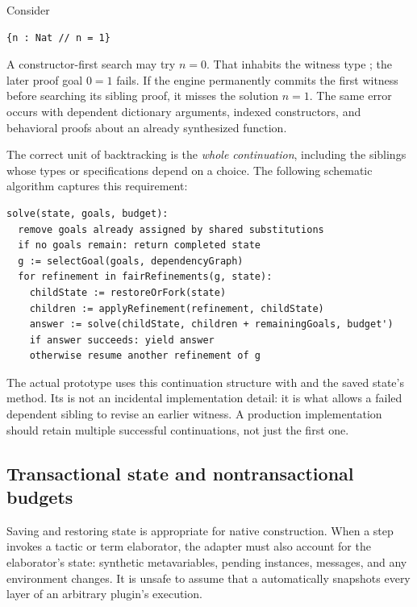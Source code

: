 Consider
\par\noindent\begin{minipage}{\linewidth}
\begin{lstlisting}
{n : Nat // n = 1}
\end{lstlisting}
\end{minipage}\par
A constructor-first search may try $n=0$. That inhabits the witness type ; the later proof goal $0=1$ fails. If the engine permanently commits the first witness before searching its sibling proof, it misses the solution $n=1$. The same error occurs with dependent dictionary arguments, indexed constructors, and behavioral proofs about an already synthesized function.

The correct unit of backtracking is the \emph{whole continuation}, including the siblings whose types or specifications depend on a choice. The following schematic algorithm captures this requirement:
\par\noindent\begin{minipage}{\linewidth}
\begin{lstlisting}[language={}]
solve(state, goals, budget):
  remove goals already assigned by shared substitutions
  if no goals remain: return completed state
  g := selectGoal(goals, dependencyGraph)
  for refinement in fairRefinements(g, state):
    childState := restoreOrFork(state)
    children := applyRefinement(refinement, childState)
    answer := solve(childState, children + remainingGoals, budget')
    if answer succeeds: yield answer
    otherwise resume another refinement of g
\end{lstlisting}
\end{minipage}\par
The actual prototype uses this continuation structure with  and the saved state's  method. Its  is not an incidental implementation detail: it is what allows a failed dependent sibling to revise an earlier witness. A production implementation should retain multiple successful continuations, not just the first one.

\subsection{Transactional state and nontransactional budgets}

Saving and restoring  state is appropriate for native construction. When a step invokes a tactic or term elaborator, the adapter must also account for the elaborator's state: synthetic metavariables, pending instances, messages, and any environment changes. It is unsafe to assume that a  automatically snapshots every layer of an arbitrary plugin's execution.

